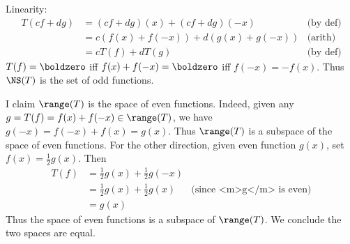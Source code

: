 \begin{solution}
\noindent Linearity:
\begin{align*}
T(cf+dg)&=(cf+dg)(x)+(cf+dg)(-x) &\text{(by def)}\\
&=c(f(x)+f(-x))+d(g(x)+g(-x)) &\text{(arith)}\\
&=cT(f)+dT(g) &\text{(by def)}
\end{align*}
\noindent $T(f)=\boldzero$ iff $f(x)+f(-x)=\boldzero$ iff $f(-x)=-f(x)$. Thus $\NS(T)$ is the set of odd functions. 

I claim $\range(T)$ is the space of even functions. Indeed, given any $g=T(f)=f(x)+f(-x)\in\range(T)$, we have $g(-x)=f(-x)+f(x)=g(x)$. Thus $\range(T)$ is a subspace of the space of even functions. For the other direction, given even function $g(x)$, set $f(x)=\frac{1}{2}g(x)$. Then 
\begin{align*}
T(f)&=\frac{1}{2}g(x)+\frac{1}{2}g(-x)\\
&=\frac{1}{2}g(x)+\frac{1}{2}g(x) &\text{(since <m>g</m> is even)}\\
&=g(x)
\end{align*}
Thus the space of even functions is a subspace of $\range(T)$. We conclude the two spaces are equal. 
\end{solution} 

\ee